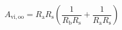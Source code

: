 \begin{equation}
A_{\mathrm{vi},\mathrm{oo}} = R_{\mathrm{a}} R_{\mathrm{s}} \left(\frac{1}{R_{\mathrm{b}} R_{\mathrm{s}}} + \frac{1}{R_{\mathrm{a}} R_{\mathrm{s}}}\right)
\end{equation}

